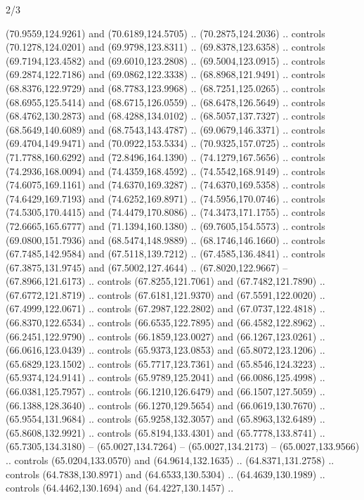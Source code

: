 \begin{flagdescription}{2/3}
\begin{scope}[shift={(0.5\flaglength,0.5)},scale=\flagwidth/320]
\begin{scope}[y=0.8pt, x=0.8pt, yscale=-1,shift={(-118.3,-146)}]
  (70.9559,124.9261) and (70.6189,124.5705) .. (70.2875,124.2036) .. controls
  (70.1278,124.0201) and (69.9798,123.8311) .. (69.8378,123.6358) .. controls
  (69.7194,123.4582) and (69.6010,123.2808) .. (69.5004,123.0915) .. controls
  (69.2874,122.7186) and (69.0862,122.3338) .. (68.8968,121.9491) .. controls
  (68.8376,122.9729) and (68.7783,123.9968) .. (68.7251,125.0265) .. controls
  (68.6955,125.5414) and (68.6715,126.0559) .. (68.6478,126.5649) .. controls
  (68.4762,130.2873) and (68.4288,134.0102) .. (68.5057,137.7327) .. controls
  (68.5649,140.6089) and (68.7543,143.4787) .. (69.0679,146.3371) .. controls
  (69.4704,149.9471) and (70.0922,153.5334) .. (70.9325,157.0725) .. controls
  (71.7788,160.6292) and (72.8496,164.1390) .. (74.1279,167.5656) .. controls
  (74.2936,168.0094) and (74.4359,168.4592) .. (74.5542,168.9149) .. controls
  (74.6075,169.1161) and (74.6370,169.3287) .. (74.6370,169.5358) .. controls
  (74.6429,169.7193) and (74.6252,169.8971) .. (74.5956,170.0746) .. controls
  (74.5305,170.4415) and (74.4479,170.8086) .. (74.3473,171.1755) .. controls
  (72.6665,165.6777) and (71.1394,160.1380) .. (69.7605,154.5573) .. controls
  (69.0800,151.7936) and (68.5474,148.9889) .. (68.1746,146.1660) .. controls
  (67.7485,142.9584) and (67.5118,139.7212) .. (67.4585,136.4841) .. controls
  (67.3875,131.9745) and (67.5002,127.4644) .. (67.8020,122.9667) --
  (67.8966,121.6173) .. controls (67.8255,121.7061) and (67.7482,121.7890) ..
  (67.6772,121.8719) .. controls (67.6181,121.9370) and (67.5591,122.0020) ..
  (67.4999,122.0671) .. controls (67.2987,122.2802) and (67.0737,122.4818) ..
  (66.8370,122.6534) .. controls (66.6535,122.7895) and (66.4582,122.8962) ..
  (66.2451,122.9790) .. controls (66.1859,123.0027) and (66.1267,123.0261) ..
  (66.0616,123.0439) .. controls (65.9373,123.0853) and (65.8072,123.1206) ..
  (65.6829,123.1502) .. controls (65.7717,123.7361) and (65.8546,124.3223) ..
  (65.9374,124.9141) .. controls (65.9789,125.2041) and (66.0086,125.4998) ..
  (66.0381,125.7957) .. controls (66.1210,126.6479) and (66.1507,127.5059) ..
  (66.1388,128.3640) .. controls (66.1270,129.5654) and (66.0619,130.7670) ..
  (65.9554,131.9684) .. controls (65.9258,132.3057) and (65.8963,132.6489) ..
  (65.8608,132.9921) .. controls (65.8194,133.4301) and (65.7778,133.8741) ..
  (65.7305,134.3180) -- (65.0027,134.7264) -- (65.0027,134.2173) --
  (65.0027,133.9566) .. controls (65.0204,133.0570) and (64.9614,132.1635) ..
  (64.8371,131.2758) .. controls (64.7838,130.8971) and (64.6533,130.5304) ..
  (64.4639,130.1989) .. controls (64.4462,130.1694) and (64.4227,130.1457) ..

\end{scope}
\end{scope}
\end{flagdescription}
